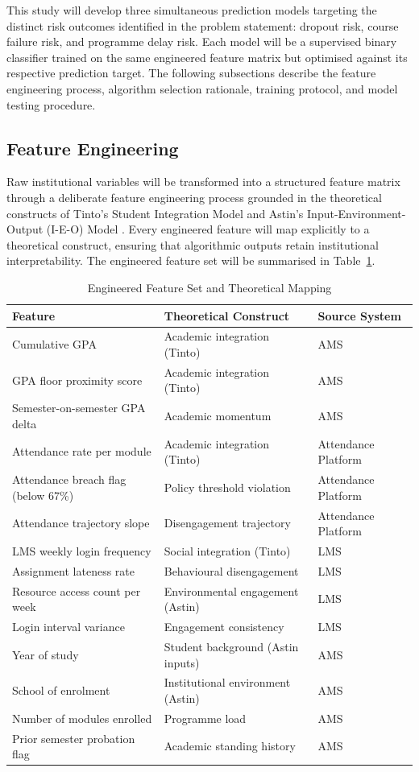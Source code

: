 \documentclass[12pt]{report}
\begin{document}
This study will develop three simultaneous prediction models targeting the distinct
risk outcomes identified in the problem statement: dropout risk, course failure risk,
and programme delay risk. Each model will be a supervised binary classifier trained
on the same engineered feature matrix but optimised against its respective prediction
target. The following subsections describe the feature engineering process, algorithm
selection rationale, training protocol, and model testing procedure.

\subsection{Feature Engineering}

Raw institutional variables will be transformed into a structured feature matrix through
a deliberate feature engineering process grounded in the theoretical constructs of
Tinto's Student Integration Model and Astin's Input-Environment-Output (I-E-O)
Model \parencite{tinto1975dropout, astin1993matters}. Every engineered feature will map
explicitly to a theoretical construct, ensuring that algorithmic outputs retain
institutional interpretability. The engineered feature set will be summarised in
Table~\ref{tab:features}.

\begin{table}[h]
\centering
\caption{Engineered Feature Set and Theoretical Mapping}
\label{tab:features}
\begin{tabular}{p{5cm} p{4cm} p{4.5cm}}
\hline
\textbf{Feature} & \textbf{Theoretical Construct} & \textbf{Source System} \\
\hline
Cumulative GPA & Academic integration (Tinto) & AMS \\
GPA floor proximity score & Academic integration (Tinto) & AMS \\
Semester-on-semester GPA delta & Academic momentum & AMS \\
Attendance rate per module & Academic integration (Tinto) & Attendance Platform \\
Attendance breach flag (below 67\%) & Policy threshold violation & Attendance Platform \\
Attendance trajectory slope & Disengagement trajectory & Attendance Platform \\
LMS weekly login frequency & Social integration (Tinto) & LMS \\
Assignment lateness rate & Behavioural disengagement & LMS \\
Resource access count per week & Environmental engagement (Astin) & LMS \\
Login interval variance & Engagement consistency & LMS \\
Year of study & Student background (Astin inputs) & AMS \\
School of enrolment & Institutional environment (Astin) & AMS \\
Number of modules enrolled & Programme load & AMS \\
Prior semester probation flag & Academic standing history & AMS \\
\hline
\end{tabular}
\end{table}
\end{document}
